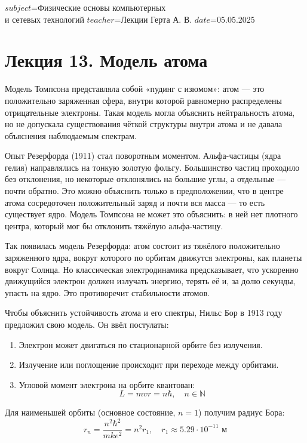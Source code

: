 $subject$=Физические основы компьютерных \\ и сетевых технологий
$teacher$=Лекции Герта А. В.
$date$=05.05.2025

\section{Лекция 13. Модель атома}

Модель Томпсона представляла собой «пудинг с изюмом»: атом — это положительно заряженная сфера, внутри которой равномерно распределены отрицательные электроны. Такая модель могла объяснить нейтральность атома, но не допускала существования чёткой структуры внутри атома и не давала объяснения наблюдаемым спектрам.

Опыт Резерфорда (1911) стал поворотным моментом. Альфа-частицы (ядра гелия) направлялись на тонкую золотую фольгу. Большинство частиц проходило без отклонения, но некоторые отклонялись на большие углы, а отдельные — почти обратно. Это можно объяснить только в предположении, что в центре атома сосредоточен положительный заряд и почти вся масса — то есть существует ядро. Модель Томпсона не может это объяснить: в ней нет плотного центра, который мог бы отклонить тяжёлую альфа-частицу.

Так появилась модель Резерфорда: атом состоит из тяжёлого положительно заряженного ядра, вокруг которого по орбитам движутся электроны, как планеты вокруг Солнца. Но классическая электродинамика предсказывает, что ускоренно движущийся электрон должен излучать энергию, терять её и, за долю секунды, упасть на ядро. Это противоречит стабильности атомов.

Чтобы объяснить устойчивость атома и его спектры, Нильс Бор в 1913 году предложил свою модель. Он ввёл постулаты:

\begin{enumerate}
    \item Электрон может двигаться по стационарной орбите без излучения.
    \item Излучение или поглощение происходит при переходе между орбитами.
    \item Угловой момент электрона на орбите квантован:
    \[
    L = m v r = n \hbar, \quad n \in \mathbb{N}
    \]
\end{enumerate}

Для наименьшей орбиты (основное состояние, $n = 1$) получим радиус Бора:
\[
r_n = \frac{n^2 \hbar^2}{m k e^2} = n^2 r_1, \quad r_1 \approx 5.29 \cdot 10^{-11} \text{ м}
\]

